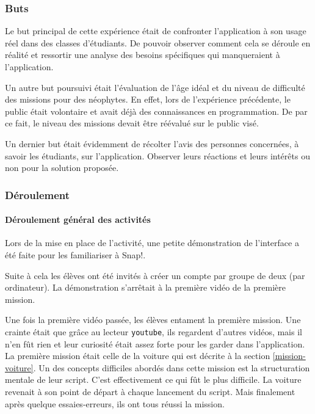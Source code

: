 \subsubsection{Buts}
Le but principal de cette expérience était de confronter l'application à son usage réel dans des classes d'étudiants. De pouvoir observer comment cela se déroule en réalité et ressortir une analyse des besoins spécifiques qui manqueraient à l'application.

Un autre but poursuivi était l'évaluation de l'âge idéal et du niveau de difficulté des missions pour des néophytes. En effet, lors de l'expérience précédente, le public était volontaire et avait déjà des connaissances en programmation. De par ce fait, le niveau des missions devait être réévalué sur le public visé.

Un dernier but était évidemment de récolter l'avis des personnes concernées, à savoir les étudiants, sur l'application. Observer leurs réactions et leurs intérêts ou non pour la solution proposée.

\subsubsection{Déroulement}
\paragraph{Déroulement général des activités}
Lors de la mise en place de l'activité, une petite démonstration de l'interface a été faite pour les familiariser à Snap!. 

Suite à cela les élèves ont été invités à créer un compte par groupe de deux (par ordinateur). La démonstration s'arrêtait à la première vidéo de la première mission.

Une fois la première vidéo passée, les élèves entament la première mission. Une crainte était que grâce au lecteur \texttt{youtube}, ils regardent d'autres vidéos, mais il n'en fût rien et leur curiosité était assez forte pour les garder dans l'application.\\

La première mission était celle de la voiture qui est décrite à la section \ref{mission-voiture}. Un des concepts difficiles abordés dans cette mission est la structuration mentale de leur script. C'est effectivement ce qui fût le plus difficile. La voiture revenait à son point de départ à chaque lancement du script. Mais finalement après quelque essaies-erreurs, ils ont tous réussi la mission.\\

